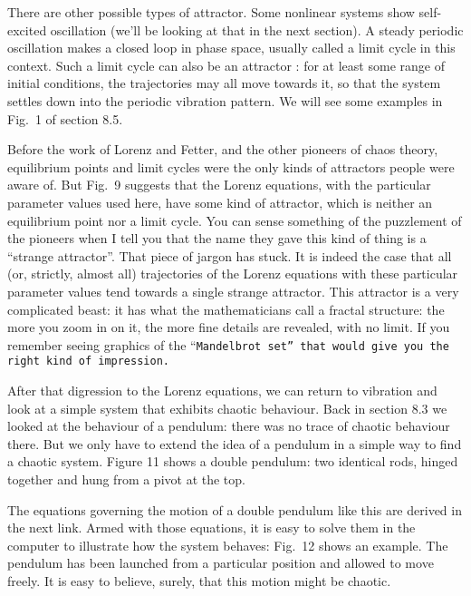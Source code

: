 
  There are other possible types of attractor. Some nonlinear systems show 
  self-excited oscillation (we’ll be looking at that in the next section). A 
  steady periodic oscillation makes a closed loop in phase space, usually 
  called a limit cycle in this context. Such a limit cycle can also be an 
  attractor : for at least some range of initial conditions, the trajectories 
  may all move towards it, so that the system settles down into the periodic 
  vibration pattern. We will see some examples in Fig.\ 1 of section 8.5. 

  Before the work of Lorenz and Fetter, and the other pioneers of chaos theory, 
  equilibrium points and limit cycles were the only kinds of attractors people 
  were aware of. But Fig.\ 9 suggests that the Lorenz equations, with the 
  particular parameter values used here, have some kind of attractor, which is 
  neither an equilibrium point nor a limit cycle. You can sense something of 
  the puzzlement of the pioneers when I tell you that the name they gave this 
  kind of thing is a “strange attractor”. That piece of jargon has stuck. It is 
  indeed the case that all (or, strictly, almost all) trajectories of the 
  Lorenz equations with these particular parameter values tend towards a single 
  strange attractor. This attractor is a very complicated beast: it has what 
  the mathematicians call a fractal structure: the more you zoom in on it, the 
  more fine details are revealed, with no limit. If you remember seeing 
  graphics of the “\tt{}Mandelbrot set\rm{}” that would give you the right kind 
  of impression. 

  After that digression to the Lorenz equations, we can return to vibration and 
  look at a simple system that exhibits chaotic behaviour. Back in section 8.3 
  we looked at the behaviour of a pendulum: there was no trace of chaotic 
  behaviour there. But we only have to extend the idea of a pendulum in a 
  simple way to find a chaotic system. Figure 11 shows a double pendulum: two 
  identical rods, hinged together and hung from a pivot at the top. 


  The equations governing the motion of a double pendulum like this are derived 
  in the next link. Armed with those equations, it is easy to solve them in the 
  computer to illustrate how the system behaves: Fig.\ 12 shows an example. The 
  pendulum has been launched from a particular position and allowed to move 
  freely. It is easy to believe, surely, that this motion might be chaotic. 

